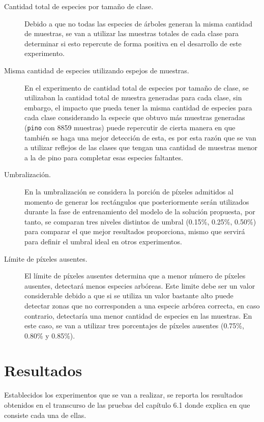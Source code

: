 \begin{description}
\item[Cantidad total de especies por tamaño de clase.]{Debido a que no todas las especies de árboles generan la misma cantidad de muestras, se van a utilizar las muestras totales de cada clase para determinar si esto repercute de forma positiva en el desarrollo de este experimento.}

\item[Misma cantidad de especies utilizando espejos de muestras.]{En el experimento de cantidad total de especies por tamaño de clase, se utilizaban la cantidad total de muestra generadas para cada clase, sin embargo, el impacto que pueda tener la misma cantidad de especies para cada clase considerando la especie que obtuvo más muestras generadas (\texttt{pino} con 8859 muestras) puede repercutir de cierta manera en que también se haga una mejor detección de esta, es por esta razón que se van a utilizar reflejos de las clases que tengan una cantidad de muestras menor a la de pino para completar esas especies faltantes.}

\item[Umbralización.]{En la umbralización se considera la porción de píxeles admitidos al momento de generar los rectángulos que posteriormente serán utilizados durante la fase de entrenamiento del modelo de la solución propuesta, por tanto, se comparan tres niveles distintos de umbral  (0.15\%, 0.25\%, 0.50\%) para comparar el que mejor resultados proporciona, mismo que servirá para definir el umbral ideal en otros experimentos.} 

\item[Límite de píxeles ausentes.]{El límite de píxeles ausentes determina que a menor número de píxeles ausentes, detectará menos especies arbóreas. Este limite debe ser un valor considerable debido a que si se utiliza un valor bastante alto puede detectar zonas que no corresponden a una especie arbórea correcta, en caso contrario, detectaría una menor cantidad de especies en las muestras. En este caso, se van a utilizar tres porcentajes de píxeles ausentes (0.75\%, 0.80\% y 0.85\%).}
\end{description}

\clearpage
\section{Resultados}
Establecidos los experimentos que se van a realizar, se reporta los resultados obtenidos en el transcurso de las pruebas del capítulo 6.1 donde explica en que consiste cada una de ellas.

